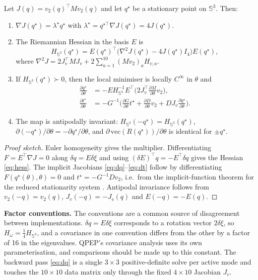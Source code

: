 \begin{theorem}\label{thm:implicit}
Let $J(q)=v_2(q)^\top Mv_2(q)$ and let $q^\star$ be a stationary point on $\mathbb{S}^3$. Then:
\begin{enumerate}
\item $\nabla J(q^\star)=\lambda^\star q^\star$ with $\lambda^\star=q^{\star\top}\nabla J(q^\star)=4J(q^\star)$.
\item The Riemannian Hessian in the basis $E$ is
\begin{equation}
H_{\mathbb{S}^3}(q^\star)=E(q^\star)^\top\big(\nabla^2J(q^\star)-4J(q^\star)I_4\big)E(q^\star),
\label{eq:hess}
\end{equation}
where $\nabla^2J=2J_v^\top MJ_v+2\sum_{a=1}^{10}(Mv_2)_aH_{v,a}$.
\item If $H_{\mathbb{S}^3}(q^\star)\succ0$, then the local minimiser is locally $C^\infty$ in $\theta$ and
\begin{align}
\frac{\partial q^\star}{\partial\theta}&=-E H_{\mathbb{S}^3}^{-1}E^\top\Big(2J_v^\top\frac{\partial M}{\partial\theta}v_2\Big),\label{eq:dq}\\
\frac{\partial t^\star}{\partial\theta}&=-G^{-1}\Big(\frac{\partial G}{\partial\theta}t^\star+\frac{\partial D}{\partial\theta}v_2+DJ_v\frac{\partial q^\star}{\partial\theta}\Big).\label{eq:dt}
\end{align}
\item The map is antipodally invariant: $H_{\mathbb{S}^3}(-q^\star)=H_{\mathbb{S}^3}(q^\star)$, $\partial(-q^\star)/\partial\theta=-\partial q^\star/\partial\theta$, and $\partial\,\mathrm{vec}(R(q^\star))/\partial\theta$ is identical for $\pm q^\star$.
\end{enumerate}
\end{theorem}

\begin{proof}[Proof sketch]
Euler homogeneity gives the multiplier. Differentiating $F=E^\top\nabla J=0$ along $\delta q=E\delta\xi$ and using $(\delta E)^\top q=-E^\top\delta q$ gives the Hessian \eqref{eq:hess}. The implicit Jacobians \eqref{eq:dq}--\eqref{eq:dt} follow by differentiating $F(q^\star(\theta),\theta)=0$ and $t^\star=-G^{-1}Dv_2$, i.e.\ from the implicit-function theorem for the reduced stationarity system \cite{dontchev2009}. Antipodal invariance follows from $v_2(-q)=v_2(q)$, $J_v(-q)=-J_v(q)$ and $E(-q)=-E(q)$.
\end{proof}

\textbf{Factor conventions.} The conventions are a common source of disagreement between implementations. $\delta q=E\delta\xi$ corresponds to a rotation vector $2\delta\xi$, so $H_\omega=\tfrac14H_{\mathbb{S}^3}$, and a covariance in one convention differs from the other by a factor of 16 in the eigenvalues. QPEP's covariance analysis \cite{wu2022qpep} uses its own parameterisation, and comparisons should be made up to this constant. The backward pass \eqref{eq:dq} is a single $3\times3$ positive-definite solve per active mode and touches the $10\times10$ data matrix only through the fixed $4\times10$ Jacobian $J_v$.

